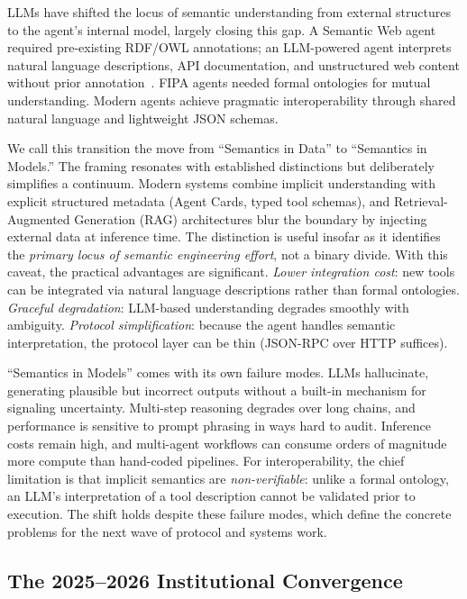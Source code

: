 \documentclass{IEEEcsmag}
\begin{document}
LLMs have shifted the locus of semantic understanding from external structures to the agent's internal model, largely closing this gap. A Semantic Web agent required pre-existing RDF/OWL annotations; an LLM-powered agent interprets natural language descriptions, API documentation, and unstructured web content without prior annotation~\cite{Yao_2023, Schick_2023}. FIPA agents needed formal ontologies for mutual understanding. Modern agents achieve pragmatic interoperability through shared natural language and lightweight JSON schemas.

We call this transition the move from ``Semantics in Data'' to ``Semantics in Models.''  The framing resonates with established distinctions but deliberately simplifies a continuum. Modern systems combine implicit understanding with explicit structured metadata (Agent Cards, typed tool schemas), and Retrieval-Augmented Generation (RAG) architectures blur the boundary by injecting external data at inference time. The distinction is useful insofar as it identifies the \emph{primary locus of semantic engineering effort}, not a binary divide. With this caveat, the practical advantages are significant.  \emph{Lower integration cost}: new tools can be integrated via natural language descriptions rather than formal ontologies.  \emph{Graceful degradation}: LLM-based understanding degrades smoothly with ambiguity.  \emph{Protocol simplification}: because the agent handles semantic interpretation, the protocol layer can be thin (JSON-RPC over HTTP suffices).

``Semantics in Models'' comes with its own failure modes. LLMs hallucinate, generating plausible but incorrect outputs without a built-in mechanism for signaling uncertainty. Multi-step reasoning degrades over long chains, and performance is sensitive to prompt phrasing in ways hard to audit. Inference costs remain high, and multi-agent workflows can consume orders of magnitude more compute than hand-coded pipelines. For interoperability, the chief limitation is that implicit semantics are \emph{non-verifiable}: unlike a formal ontology, an LLM's interpretation of a tool description cannot be validated prior to execution. The shift holds despite these failure modes, which define the concrete problems for the next wave of protocol and systems work.

\subsection{The 2025--2026 Institutional Convergence}\label{sec:convergence}
\end{document}
